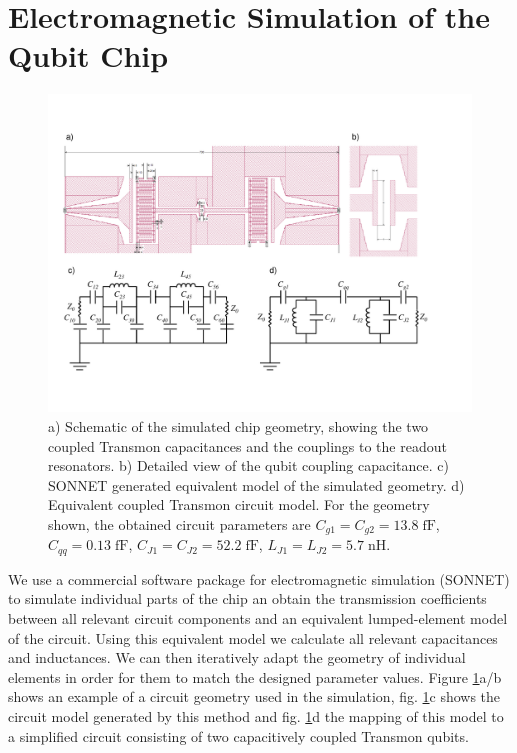 \section{Electromagnetic Simulation of the Qubit Chip}

\begin{figure}[ht!]
	\centering
	\includegraphics[width=\textwidth]{./material/figures/2-qubit-processor/sonnet_model}
	\caption[]{a) Schematic of the simulated chip geometry, showing the two coupled Transmon capacitances and the couplings to the readout resonators. b) Detailed view of the qubit coupling capacitance. c) SONNET generated equivalent model of the simulated geometry. d) Equivalent coupled Transmon circuit model. For the geometry shown, the obtained circuit parameters are $C_{g1}=C_{g2}=13.8\;\mathrm{fF}$, $C_{qq}=0.13\;\mathrm{fF}$, $C_{J1}=C_{J2}=52.2\;\mathrm{fF}$, $L_{J1}=L_{J2}=5.7\;\mathrm{nH}$.}
	\label{fig:sonnet_generated_model}
\end{figure}

We use a commercial software package for electromagnetic simulation (SONNET) to simulate individual parts of the chip an obtain the transmission coefficients between all relevant circuit components and an equivalent lumped-element model of the circuit. Using this equivalent model we calculate all relevant capacitances and inductances. We can then iteratively adapt the geometry of individual elements in order for them to match the designed parameter values. Figure \ref{fig:sonnet_generated_model}a/b shows an example of a circuit geometry used in the simulation, fig. \ref{fig:sonnet_generated_model}c shows the circuit model generated by this method and fig. \ref{fig:sonnet_generated_model}d the mapping of this model to a simplified circuit consisting of two capacitively coupled Transmon qubits.

